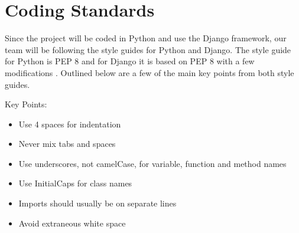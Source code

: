 \section{Coding Standards}
Since the project will be coded in Python and use the Django framework, our team will be following the style guides for Python and Django. The style guide for Python is PEP 8 \cite{website:PEP8} and for Django it is based on PEP 8 with a few modifications \cite{website:DjangoStyleGuide}. Outlined below are a few of the main key points from both style guides.

Key Points:
\begin{itemize}
\item Use 4 spaces for indentation
\item Never mix tabs and spaces
\item Use underscores, not camelCase, for variable, function and method names
\item Use InitialCaps for class names
\item Imports should usually be on separate lines
\item Avoid extraneous white space
\end{itemize}